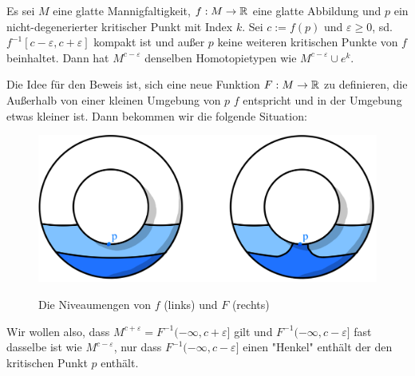 \begin{theorem}
    \label{satz: zweites deformationslemma}
    Es sei $M$ eine glatte Mannigfaltigkeit, $f: M \rightarrow { \mathbb R }$ eine glatte
    Abbildung und $p$ ein nicht-degenerierter kritischer Punkt mit Index 
    $k$. Sei $c := f(p)$ und $\varepsilon \geq 0$, sd. 
    $f^{-1}[c - \varepsilon, c + \varepsilon]$ kompakt ist und außer $p$ keine 
    weiteren kritischen Punkte von $f$ beinhaltet. Dann hat $M^{c-\varepsilon}$
    denselben Homotopietypen wie $M^{c - \varepsilon} \cup e^k$.
\end{theorem}

Die Idee für den Beweis ist, sich eine neue Funktion $F: M \to { \mathbb R }$ zu definieren,
die Außerhalb von einer kleinen Umgebung von $p$ $f$ entspricht und in der 
Umgebung etwas kleiner ist. Dann bekommen wir die folgende Situation:

\begin{figure}[H]
    \centering
    \includegraphics[width=0.8\linewidth]{../resources/Me-Diagram5-sublevelsets-of-f-and-F.jpeg}
    \label{fig:me-diagram5}
    \caption{Die Niveaumengen von $f$ (links) und $F$ (rechts)}
\end{figure}

Wir wollen also, dass $M^{c + \varepsilon} = F^{-1}(- \infty, c + \varepsilon]$ 
gilt und $F^{-1}(-\infty, c - \varepsilon]$ fast dasselbe ist wie 
$M^{c - \varepsilon}$, nur dass $F^{-1}(-\infty, c - \varepsilon]$ einen "Henkel"
enthält der den kritischen Punkt $p$ enthält.

